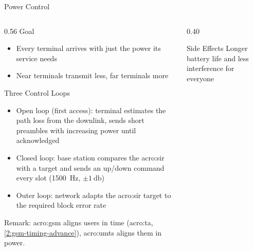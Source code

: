 \begin{frame}{Power Control}
  \begin{columns}[T,onlytextwidth]
    \begin{column}{0.56\textwidth}
      Goal
      \begin{itemize}
        \item Every terminal arrives with just the power its service needs
        \item Near terminals transmit less, far terminals more
      \end{itemize}
      \vspace{0.4em}
      Three Control Loops
      \begin{itemize}
        \item Open loop (first access): terminal estimates the path loss from the downlink, sends short preambles with increasing power until acknowledged
        \item Closed loop: base station compares the \gls{acro:sir} with a target and sends an up/down command every slot (\qty{1500}{\hertz}, $\pm\qty{1}{\decibel}$)~\cite{ts25214}
        \item Outer loop: network adapts the \gls{acro:sir} target to the required block error rate
      \end{itemize}
      \alert{Remark:} \Gls{acro:gsm} aligns users in time (\gls{acro:ta}, \cref{2:gsm-timing-advance}), \gls{acro:umts} aligns them in power.
    \end{column}
    \begin{column}{0.40\textwidth}
      \begin{block}{Side Effects}
        Longer battery life and less interference for everyone
      \end{block}
    \end{column}
  \end{columns}
\end{frame}

